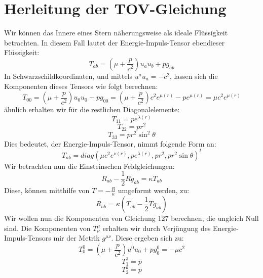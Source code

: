 \documentclass[a4paper]{article}
\begin{document}
\section{Herleitung der TOV-Gleichung}
Wir können das Innere eines Stern näherungsweise als ideale Flüssigkeit betrachten. In diesem Fall lautet der Energie-Impuls-Tensor ebendieser Flüssigkeit:
\begin{equation}
    T_{ab}=(\mu+\frac{p}{c^2})u_au_b+pg_{ab}
\end{equation}
In Schwarzschildkoordinaten, und mittels $u^au_a=-c^2$, lassen sich die Komponenten dieses Tensors wie folgt berechnen:
\begin{equation}
    T_{00}=(\mu+\frac{p}{c^2})u_0u_0-pg_{00}=(\mu+\frac{p}{c^2})c^2e^{\mu(r)}-pe^{\mu(r)}=\mu c^2e^{\mu(r)}
\end{equation}
ähnlich erhalten wir für die restlichen Diagonalelemente:
\begin{equation}
    T_{11}=pe^{\lambda(r)}
\end{equation}
\begin{equation}
    T_{22}=pr^2
\end{equation}
\begin{equation}
    T_{33}=pr^2\sin^2{\theta}
\end{equation}
Dies bedeutet, der Energie-Impuls-Tensor, nimmt folgende Form an:
\begin{equation}
    T_{ab}=diag(\mu c^2e^{\nu(r)},pe^{\lambda(r)},pr^2,pr^2\sin{\theta})^t
\end{equation}
Wir betrachten nun die Einsteinschen Feldgleichungen:
\begin{equation}
    R_{ab}-\frac{1}{2}Rg_{ab}=\kappa T_{ab}
\end{equation}
Diese, können mitthilfe von $T=-\frac{R}{\kappa}$ umgeformt werden, zu:
\begin{equation}
    R_{ab}=\kappa(T_{ab}-\frac{1}{2}Tg_{ab})
\end{equation}
Wir wollen nun die Komponenten von Gleichung 127 berechnen, die ungleich Null sind.
Die Komponenten von $T^\mu_\nu$ erhalten wir durch Verjüngung des Energie-Impuls-Tensors mir der Metrik $g^{\mu\nu}$.
Diese ergeben sich zu:
\begin{equation}
    T^0_0=(\mu+\frac{p}{c^2})u^0u_0+pg^0_0=-\mu c^2
\end{equation}
\begin{equation}
    T^1_1=p
\end{equation}
\begin{equation}
    T^2_2=p
\end{equation}
\end{document}
